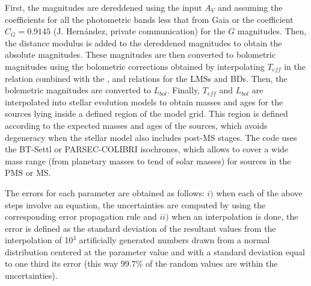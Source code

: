 \documentclass[12pt]{article}
\begin{document}
First, the magnitudes are dereddened using the input $A_V$ and assuming the \citet{Cardelli1989} coefficients for all the photometric bands less that from Gaia or the coefficient $C_G=0.9145$ (J. Hern\'andez, private communication) for the $G$ magnitudes. Then, the distance modulus is added to the dereddened magnitudes to obtain the absolute magnitudes. These magnitudes are then converted to bolometric magnitudes using the bolometric corrections obtained by interpolating $T_{eff}$ in the \citet{Kenyon-Hartmann1995} relation combined with the \citet{Luhman1999}, \citet{Briceno2002} and \citet{Luhman2003b} relations for the LMSs and BDs. Then, the bolemetric magnitudes are converted to $L_{bol}$. Finally, $T_{eff}$ and $L_{bol}$ are interpolated into stellar evolution models to obtain masses and ages for the sources lying inside a defined region of the model grid. This region is defined according to the expected masses and ages of the sources, which avoids degeneracy when the stellar model also includes post-MS stages. The code uses the BT-Settl or PARSEC-COLIBRI isochrones, which allows to cover a wide mass range (from planetary masses to tend of solar masses) for sources in the PMS or MS.

The errors for each parameter are obtained as follows: $i)$ when each of the above steps involve an equation, the uncertainties are computed by using the corresponding error propagation rule and $ii)$ when an interpolation is done, the error is defined as the standard deviation of the resultant values from the interpolation of 10$^3$ artificially generated numbers drawn from a normal distribution centered at the parameter value and with a standard deviation equal to one third its error (this way 99.7\% of the random values are within the uncertainties).
\end{document}
